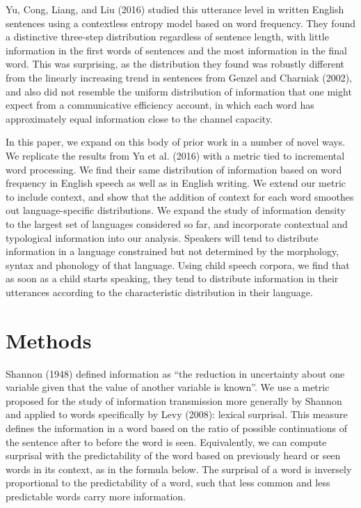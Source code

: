 \documentclass[man,floatsintext]{apa6}
\begin{document}
Yu, Cong, Liang, and Liu (2016) studied this utterance level in written English sentences using a contextless entropy model based on word frequency. They found a distinctive three-step distribution regardless of sentence length, with little information in the first words of sentences and the most information in the final word. This was surprising, as the distribution they found was robustly different from the linearly increasing trend in sentences from Genzel and Charniak (2002), and also did not resemble the uniform distribution of information that one might expect from a communicative efficiency account, in which each word has approximately equal information close to the channel capacity.

In this paper, we expand on this body of prior work in a number of novel ways. We replicate the results from Yu et al. (2016) with a metric tied to incremental word processing. We find their same distribution of information based on word frequency in English speech as well as in English writing. We extend our metric to include context, and show that the addition of context for each word smoothes out language-specific distributions. We expand the study of information density to the largest set of languages considered so far, and incorporate contextual and typological information into our analysis. Speakers will tend to distribute information in a language constrained but not determined by the morphology, syntax and phonology of that language. Using child speech corpora, we find that as soon as a child starts speaking, they tend to distribute information in their utterances according to the characteristic distribution in their language.

\hypertarget{methods}{%
\section{Methods}\label{methods}}

Shannon (1948) defined information as \enquote{the reduction in uncertainty about one variable given that the value of another variable is known}. We use a metric proposed for the study of information transmission more generally by Shannon and applied to words specifically by Levy (2008): lexical surprisal. This measure defines the information in a word based on the ratio of possible continuations of the sentence after to before the word is seen. Equivalently, we can compute surprisal with the predictability of the word based on previously heard or seen words in its context, as in the formula below. The surprisal of a word is inversely proportional to the predictability of a word, such that less common and less predictable words carry more information.
\end{document}
